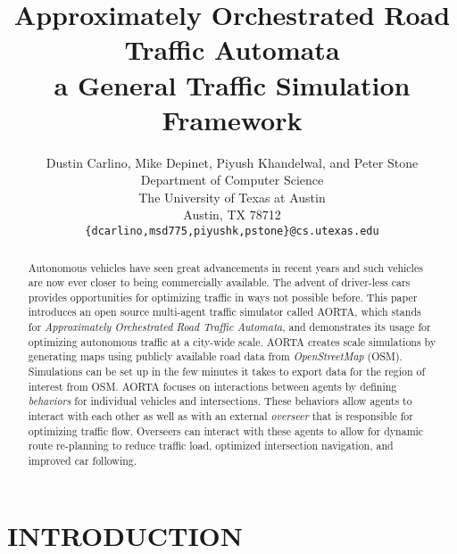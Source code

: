 \documentclass[letterpaper, 10 pt, conference]{ieeeconf}  %
\title{\LARGE \bf
Approximately Orchestrated Road Traffic Automata\\
a General Traffic Simulation Framework
}
\author{Dustin Carlino, Mike Depinet, Piyush Khandelwal, and Peter Stone\\
        Department of Computer Science\\
        The University of Texas at Austin\\
        Austin, TX 78712\\
        {\tt \small\{dcarlino,msd775,piyushk,pstone\}@cs.utexas.edu}}
\begin{document}
\maketitle
\thispagestyle{empty}
\pagestyle{empty}



\begin{abstract}
Autonomous vehicles have seen great advancements in recent years and such vehicles are now ever closer to being commercially available. The advent of driver-less cars provides opportunities for optimizing traffic in ways not possible before. This paper introduces an open source multi-agent traffic simulator called AORTA, which stands for \textit{Approximately Orchestrated Road Traffic Automata}, and demonstrates its usage for optimizing autonomous traffic at a city-wide scale. AORTA creates scale simulations by generating maps using publicly available road data from \textit{OpenStreetMap} (OSM). Simulations can be set up in the few minutes it takes to export data for the region of interest from OSM. AORTA focuses on interactions between agents by defining \textit{behaviors} for individual vehicles and intersections. These behaviors allow agents to interact with each other as well as with an external \textit{overseer} that is responsible for optimizing traffic flow. Overseers can interact with these agents to allow for dynamic route re-planning to reduce traffic load, optimized intersection navigation, and improved car following. 
\end{abstract}


\section{INTRODUCTION}
\label{sec:introduction}

\end{document}
